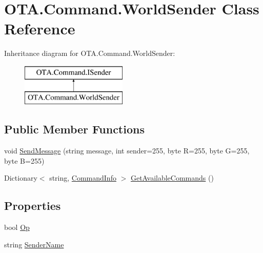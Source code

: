 \hypertarget{class_o_t_a_1_1_command_1_1_world_sender}{}\section{O\+T\+A.\+Command.\+World\+Sender Class Reference}
\label{class_o_t_a_1_1_command_1_1_world_sender}
Inheritance diagram for O\+T\+A.\+Command.\+World\+Sender\+:\begin{figure}[H]
\begin{center}
\leavevmode
\includegraphics[height=2.000000cm]{class_o_t_a_1_1_command_1_1_world_sender}
\end{center}
\end{figure}
\subsection*{Public Member Functions}
\begin{DoxyCompactItemize}
\item 
void \hyperlink{class_o_t_a_1_1_command_1_1_world_sender_ae9a43321b90fd540c6b19cfa04babffa}{Send\+Message} (string message, int sender=255, byte R=255, byte G=255, byte B=255)
\item 
Dictionary$<$ string, \hyperlink{class_o_t_a_1_1_command_1_1_command_info}{Command\+Info} $>$ \hyperlink{class_o_t_a_1_1_command_1_1_world_sender_ac9f06672fb86ae270489f93caaa116c8}{Get\+Available\+Commands} ()
\end{DoxyCompactItemize}
\subsection*{Properties}
\begin{DoxyCompactItemize}
\item 
bool \hyperlink{class_o_t_a_1_1_command_1_1_world_sender_ada3b598e15863bdc30f6048b64119de7}{Op}
\item 
string \hyperlink{class_o_t_a_1_1_command_1_1_world_sender_a39565a0a172a88320b2e4b4559481c21}{Sender\+Name}
\end{DoxyCompactItemize}


